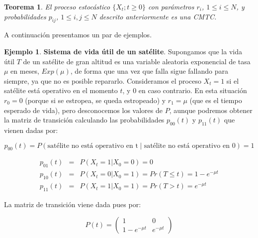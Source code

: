 \documentclass[
]{book}
\newtheorem{theorem}{Teorema}[chapter]
\theoremstyle{definition}
\theoremstyle{definition}
\newtheorem{example}{Ejemplo}[chapter]
\theoremstyle{definition}
\theoremstyle{definition}
\theoremstyle{remark}
\begin{document}
\begin{theorem}
\protect\hypertarget{thm:thecmtc001}{}\label{thm:thecmtc001}El proceso estocástico \(\{X_t; t \geq 0\}\) con parámetros \(r_i\), \(1 \leq i \leq N\), y probabilidades \(p_{ij}\), \(1 \leq i,j \leq N\) descrito anteriormente es una CMTC.
\end{theorem}

A continuación presentamos un par de ejemplos.

\begin{example}
\protect\hypertarget{exm:excmtc001}{}\label{exm:excmtc001}\textbf{Sistema de vida útil de un satélite}. Supongamos que la vida útil \(T\) de un satélite de gran altitud es una variable aleatoria exponencial de tasa \(\mu\) en meses, \(Exp(\mu)\), de forma que una vez que falla sigue fallando para siempre, ya que no es posible repararlo. Consideramos el proceso \(X_t = 1\) si el satélite está operativo en el momento \(t\), y 0 en caso contrario. En esta situación \(r_0 = 0\) (porque si se estropea, se queda estropeado) y \(r_1 = \mu\) (que es el tiempo esperado de vida), pero desconocemos los valores de \(P\), aunque podremos obtener la matriz de transición calculando las probabilidades \(p_{00}(t)\) y \(p_{11}(t)\) que vienen dadas por:

\[p_{00}(t) = P(\text{satélite no está operativo en t} \mid \text{satélite no está operativo en 0}) = 1\]

\begin{eqnarray*}
p_{01}(t) &=& P(X_t=1|X_0=0) = 0 \\
p_{10}(t) &=& P(X_t=0|X_0=1) = Pr(T \leq t) = 1- e^{-\mu t}\\
p_{11}(t) &=& P(X_t=1|X_0=1) = Pr(T >t) = e^{-\mu t}
\end{eqnarray*}

La matriz de transición viene dada pues por:

\[P(t) = 
\begin{pmatrix}
1 & 0\\
1- e^{-\mu t} & e^{-\mu t} 
\end{pmatrix}\]
\end{example}
\end{document}
